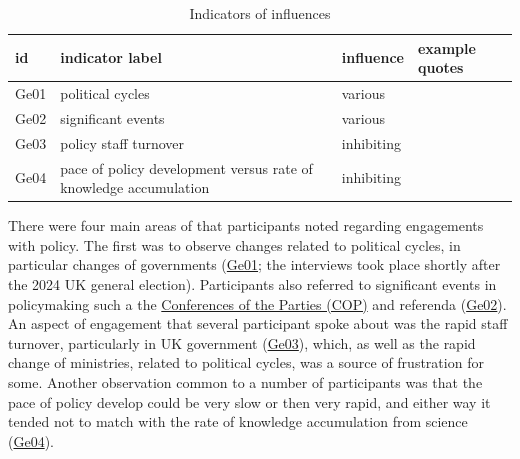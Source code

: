 \begin{table}[!ht]
\footnotesize
\caption{Indicators of \skieven{} influences}\label{tab:resskieven}
\begin{tabular}{L{.07\linewidth}L{.3\linewidth}L{.11\linewidth}L{.52\linewidth}} \hline
\textbf{id} & \textbf{indicator label} & \textbf{influence} & \textbf{example quotes} \\ \hline \hline 
Ge01 & political cycles & various &  \\
Ge02 & significant events & various &  \\
Ge03 & policy staff turnover & inhibiting &  \\
Ge04 & pace of policy development versus rate of knowledge accumulation & inhibiting &  \\
\hline
\end{tabular}
\end{table}

There were four main areas of \skieven{} that participants noted regarding engagements with policy. The first was to observe changes related to political cycles, in particular changes of governments (\hyperref[tab:resskieven]{Ge01}; the interviews took place shortly after the 2024 UK general election). Participants also referred to significant events in policymaking such a the \href{https://unfccc.int/process/bodies/supreme-bodies/conference-of-the-parties-cop}{Conferences of the Parties (COP)} and referenda (\hyperref[tab:resskieven]{Ge02}). An aspect of engagement that several participant spoke about was the rapid staff turnover, particularly in UK government (\hyperref[tab:resskieven]{Ge03}), which, as well as the rapid change of ministries, related to political cycles, was a source of frustration for some. Another observation common to a number of participants was that the pace of policy develop could be very slow or then very rapid, and either way it tended not to match with the rate of knowledge accumulation from science (\hyperref[tab:resskieven]{Ge04}). 

